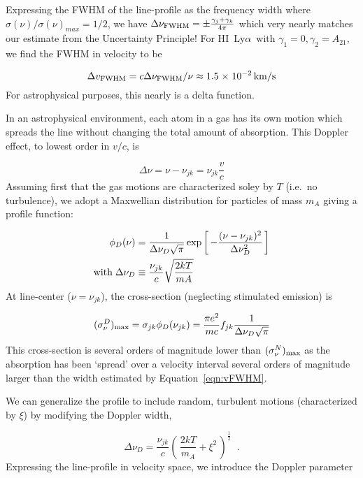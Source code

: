 \documentclass[graybox]{svmult}
\newcommand{\HI}{H{\sc I}}
\def\lya{Ly$\alpha$}
\def\ohf{\frac{1}{2}}
\def\ltk{\left [ \,}
\def\ltp{\left ( \,}
\def\rtk{\, \right  ] }
\def\rtp{\, \right  ) }
\def\sci#1{{\; \times \; 10^{#1}}}
\begin{document}
Expressing the FWHM of the line-profile as 
the frequency width where $\sigma(\nu)/\sigma(\nu)_{max} = 1/2$,
we have $\Delta\nu_{\rm FWHM} = \pm \frac{\gamma_j + \gamma_k}{4\pi}$
which very nearly matches our estimate from the
Uncertainty Principle!
For \HI\ \lya\ with $\gamma_1=0, \gamma_2=A_{21}$,
we find the FWHM in velocity to be 

\begin{equation}
\Delta v_{\rm FWHM} = c \Delta\nu_{\rm FWHM}/\nu
\approx 1.5\sci{-2} \, {\rm km/s}  
\label{eqn:vFWHM}
\end{equation}
For astrophysical purposes,
this nearly is a delta function.

In an astrophysical environment, each 
atom in a gas has its own motion 
which spreads the line without changing the total 
amount of absorption.  
This Doppler effect, to lowest order in $v/c$, is

\begin{equation}
\Delta\nu = \nu - \nu_{jk} = \nu_{jk} \frac{v}{c}
\end{equation}
Assuming first that the gas motions are characterized
soley by $T$ (i.e.\ no turbulence),
we adopt a Maxwellian distribution for particles of mass $m_A$
giving a profile function:

\begin{align}
\phi_D(\nu) &= \frac{1}{\Delta \nu_D \sqrt{\pi}} 
\exp \ltk - \frac{(\nu - \nu_{jk})^2}{\Delta \nu_D^2} \rtk \\
{\rm with} \; \Delta \nu_D &\equiv \frac{\nu_{jk}}{c} \sqrt{\frac{2kT}{mA}}
\end{align}
At line-center ($\nu = \nu_{jk}$),
the cross-section (neglecting stimulated emission) is

\begin{equation}
(\sigma_\nu^D)_{\rm max} = \sigma_{jk} \phi_D(\nu_{jk})  
	= \frac{\pi e^2}{mc} f_{jk} \frac{1}{\Delta \nu_D \sqrt{\pi}}
\label{eqn:Dlinecenter}
\end{equation}
This cross-section is several orders of magnitude
lower than $(\sigma_\nu^N)_{\rm max}$ as the absorption has
been `spread' over a velocity interval several orders of
magnitude larger than the width estimated by Equation~\ref{eqn:vFWHM}.

We can generalize the profile to include random, turbulent
motions (characterized by $\xi$)
by modifying the Doppler width,

\begin{equation}
\Delta\nu_D = \frac{\nu_{jk}}{c} \ltp \frac{2kT}{m_A} + 
\xi^2 \rtp^\ohf \;\; .
\end{equation}
Expressing the line-profile in velocity space, we introduce
the Doppler parameter
\end{document}
